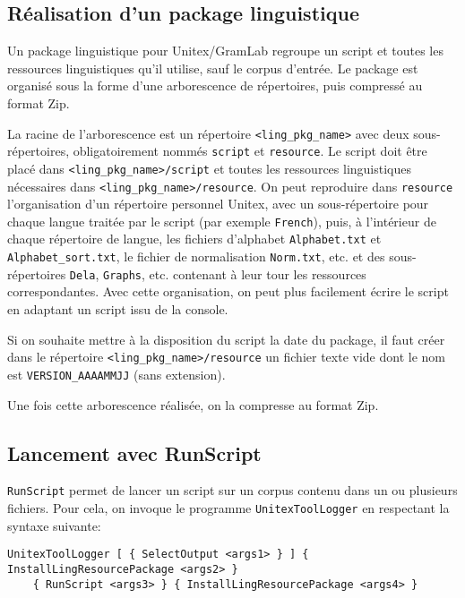 \subsection{Réalisation d'un package linguistique}
\label{section-creation}

Un package linguistique pour Unitex/GramLab regroupe un script et toutes les ressources linguistiques
qu'il utilise, sauf le corpus d'entrée. Le package est organisé sous la forme d'une arborescence
de répertoires, puis compressé au format Zip.

\bigskip     {}
\noindent La racine de l'arborescence est un répertoire \verb$<ling_pkg_name>$ avec deux
sous-répertoires, obligatoirement nommés \verb$script$ et \verb$resource$. Le script doit être placé
dans \verb$<ling_pkg_name>/script$ et toutes les ressources linguistiques nécessaires dans
\verb$<ling_pkg_name>/resource$. On peut reproduire dans \verb$resource$ l'organisation d'un
répertoire personnel Unitex, avec un sous-répertoire pour chaque langue traitée par le script
(par exemple \verb$French$), puis, à l'intérieur de chaque répertoire de langue, les fichiers d'alphabet
\verb$Alphabet.txt$ et \verb$Alphabet_sort.txt$, le fichier de normalisation \verb$Norm.txt$, etc. et
des sous-répertoires \verb$Dela$, \verb$Graphs$, etc. contenant à leur tour les ressources
correspondantes. Avec cette organisation, on peut plus facilement écrire le script en adaptant un script
issu de la console.

\bigskip
\noindent Si on souhaite mettre à la disposition du script la date du package, il faut créer dans le
répertoire \verb$<ling_pkg_name>/resource$ un fichier texte vide dont le nom est
\verb$VERSION_AAAAMMJJ$ (sans extension).

\bigskip
\noindent Une fois cette arborescence réalisée, on la compresse au format Zip.

\subsection{Lancement avec RunScript}
\label{section-runscript}
\verb$RunScript$ permet de lancer un script sur un corpus contenu dans un ou plusieurs fichiers.
Pour cela, on invoque le programme \verb$UnitexToolLogger$ en respectant la syntaxe suivante:

\begin{Verbatim}[fontsize=\small,fontfamily=helvetica]
UnitexToolLogger [ { SelectOutput <args1> } ] { InstallLingResourcePackage <args2> } 
    { RunScript <args3> } { InstallLingResourcePackage <args4> }
\end{Verbatim}

